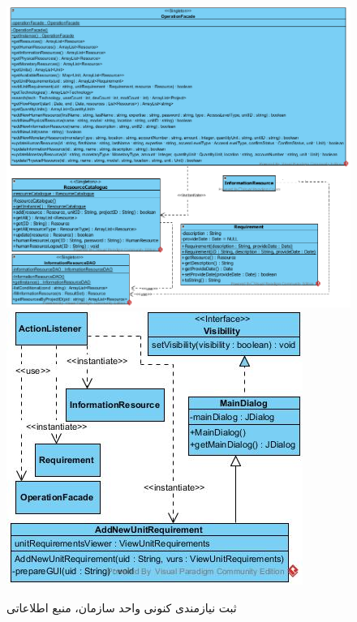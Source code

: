 \begin{landscape}
\begin{figure}[H]
\end{figure}
\begin{figure}[H]
	\centering
	\includegraphics[scale=0.5]{img/sequence-design/AddRequirementToUnit_INFORMATIONC}
	\includegraphics[scale=0.5]{img/sequence-design/AddRequirementToUnit_INFORMATIONUI}
	\caption{ثبت نیازمندی کنونی واحد سازمان، منبع اطلاعاتی}
\end{figure}

\newpage

\end{landscape}
